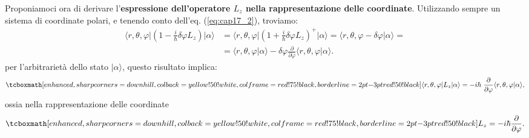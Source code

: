 \documentclass[a4paper,12pt,oneside]{book}
\begin{document}
Proponiamoci ora di derivare l'\textbf{espressione dell'operatore $L_z$ nella rappresentazione delle coordinate}. Utilizzando sempre un sistema di coordinate polari, e tenendo conto dell'eq. (\ref{eq:cap17_2}), troviamo:
	\begin{align}
		\langle r, \theta, \varphi \vert \left(1- \frac{i}{\hbar}\delta \varphi L_z\right) \vert \alpha\rangle &= \langle r, \theta, \varphi \vert \left(1+ \frac{i}{\hbar}\delta \varphi L_z\right) ^+ \vert \alpha\rangle =  \langle r, \theta, \varphi - \delta \varphi \vert\alpha\rangle  = \nonumber \\
		&= \langle r, \theta, \varphi \vert \alpha\rangle - \delta \varphi \frac{\partial}{\partial \varphi}\langle r, \theta, \varphi \vert\alpha\rangle .
	\end{align}
per l'arbitrarietà dello stato $\vert \alpha \rangle$, questo risultato implica:
	\begin{equation}
		\tcboxmath[enhanced, sharp corners=downhill, colback=yellow!50!white, colframe=red!75!black, borderline={2pt}{-3pt}{red!50!black}]{
			\langle r, \theta, \varphi \vert  L_z \vert \alpha\rangle =- i\hbar\ \frac{\partial}{\partial \varphi}\langle r, \theta, \varphi \vert\alpha\rangle ,
			}
	\end{equation}
ossia nella rappresentazione delle coordinate
	\begin{equation}
		\tcboxmath[enhanced, sharp corners=downhill, colback=yellow!50!white, colframe=red!75!black, borderline={2pt}{-3pt}{red!50!black}]{
			L_z = -i\hbar \frac{\partial}{\partial \varphi}.
			}
	\label{eq:cap17_4}
	\end{equation}\\
	
\end{document}
